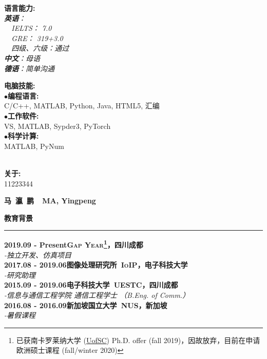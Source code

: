 \documentclass[a4paper,11pt,final]{memoir}
\newcommand{\myThemeColor}{RoyalBlue}
\newcommand{\SmallSep}{\vspace{0.9em}}
\newcommand{\CVSection}[1]
	{\Large\textbf{#1}\par
	\vspace{0.2cm}\normalsize\normalfont}
\newcommand{\CVItem}[1]
	{\textbf{\color{\myThemeColor} #1}}
\begin{document}
\begin{CJK*}{UTF8}{gbsn}
\begin{flushright}
		
	\CVItem{{\large 语言能力:}}\\
	\textit{\textbf{英语}：\\
		    ~~IELTS： 7.0\\
		    ~~GRE： 319+3.0\\
		    ~~四级、六级：通过\\
		   \textbf{中文}：母语 \\ 
		   \textbf{德语}：简单沟通
			}
	
	\CVItem{{\large 电脑技能:}}\\
	$\bullet$\textbf{编程语言:}\\ C/C++, MATLAB, Python, Java, HTML5, 汇编 \\
	$\bullet$\textbf{工作软件:}\\ VS, MATLAB, Sypder3, PyTorch \\
	$\bullet$\textbf{科学计算:}\\ MATLAB, PyNum
	

	\CVItem{ }\\
	\textbf{关于:}\\ 11223344 \\


\end{flushright}\normalsize
\framebreak


\Huge\bfseries {\color{\myThemeColor} 马~瀛~鹏~~MA, Yingpeng}\\
\normalsize\normalfont

\CVSection{教育背景}
\hrule
\SmallSep
\CVItem{2019.09 - Present\hfill\textsc{Gap Year\footnote{已获南卡罗莱纳大学 (\href{https://sc.edu/}{UofSC}) Ph.D. offer (fall 2019)，因故放弃，目前在申请欧洲硕士课程 (fall/winter 2020)}，四川成都}}\\
\textit{-独立开发、仿真项目}
\\
\CVItem{2017.08 - 2019.06\hfill\textsc{图像处理研究所~IoIP，电子科技大学}}\\
\textit{-研究助理}
\\
\CVItem{2015.09 - 2019.06\hfill\textsc{电子科技大学~UESTC，四川成都}}\\
\textit{-信息与通信工程学院 \quad 通信工程学士 （B.Eng. of Comm.）}
\\
\CVItem{2016.08 - 2016.09\hfill\textsc{新加坡国立大学~NUS，新加坡}}\\
\textit{-暑假课程}
\\



\end{CJK*}
\end{document}
